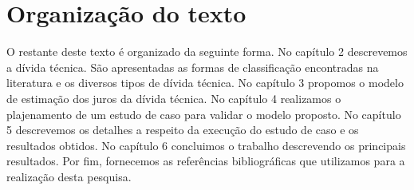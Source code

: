 \section{Organização do texto}

O restante deste texto é organizado da seguinte forma. No capítulo 2 descrevemos a dívida técnica. São apresentadas as formas de classificação encontradas na literatura e os diversos tipos de dívida técnica. No capítulo 3 propomos o modelo de estimação dos juros da dívida técnica.  No capítulo 4 realizamos o plajenamento de um estudo de caso para validar o modelo  proposto. No capítulo 5 descrevemos os detalhes a respeito da execução do estudo de caso e os resultados obtidos.  No capítulo 6 concluimos o trabalho descrevendo os principais resultados. Por fim, fornecemos as referências bibliográficas que utilizamos para a realização desta pesquisa.






























